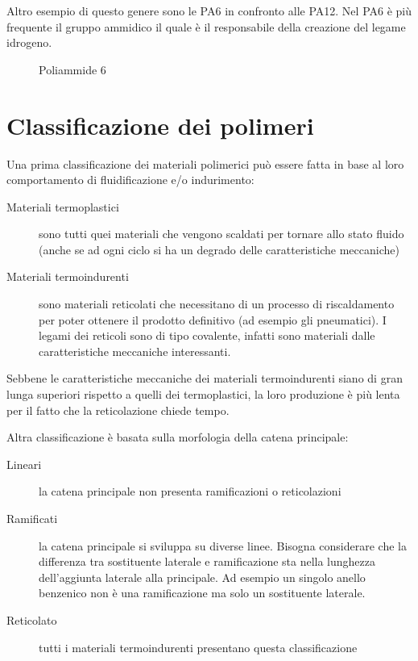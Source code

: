 Altro esempio di questo genere sono le \ac{PA}6 in confronto alle \ac{PA}12.
Nel \ac{PA}6 è più frequente il gruppo ammidico
{}
il quale è il responsabile della creazione del legame idrogeno.

\begin{figure}
\centering
{}
\caption{Poliammide 6}
\label{fig:PA6}
\end{figure}

\chapter{Classificazione dei polimeri}\label{chp:Classificazione}
Una prima classificazione dei materiali polimerici può essere fatta in base al loro comportamento di fluidificazione e/o indurimento:
\begin{description}
\item[Materiali termoplastici] sono tutti quei materiali che vengono scaldati per tornare allo stato fluido (anche se ad ogni ciclo si ha un degrado delle caratteristiche meccaniche)
\item[Materiali termoindurenti] sono materiali reticolati che necessitano di un processo di riscaldamento per poter ottenere il prodotto definitivo (ad esempio gli pneumatici). I legami dei reticoli sono di tipo covalente, infatti sono materiali dalle caratteristiche meccaniche interessanti.
\end{description}
Sebbene le caratteristiche meccaniche dei materiali termoindurenti siano di gran lunga superiori rispetto a quelli dei termoplastici, la loro produzione è più lenta per il fatto che la reticolazione chiede tempo.

Altra classificazione è basata sulla morfologia della catena principale:
\begin{description}
\item[Lineari] la catena principale non presenta ramificazioni o reticolazioni
\item[Ramificati] la catena principale si sviluppa su diverse linee. Bisogna considerare che la differenza tra sostituente laterale e ramificazione sta nella lunghezza dell'aggiunta laterale alla principale. Ad esempio un singolo anello benzenico non è una ramificazione ma solo un sostituente laterale.
\item[Reticolato] tutti i materiali termoindurenti presentano questa classificazione
\end{description}

